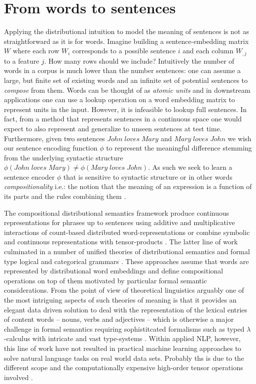\section{From words to sentences}
\label{sec:sentences}
Applying the distributional intuition to model the meaning of sentences is not as straightforward
as it is for words.
Imagine building a sentence-embedding matrix $W$ where each row $W_i$ corresponds to
a possible sentence $i$ and each column $W_{,j}$ to a feature $j$.
How many rows should we include? Intuitively the number of words in a corpus is much
lower than the number sentences: one can assume a large, but finite set
of existing words and an infinite set of
potential sentences to \emph{compose} from them.
Words can be thought of as \emph{atomic units} and
in downstream applications one can use a lookup operation on a word embedding matrix
to represent units in the input. However, it is infeasible to lookup full sentences.
In fact, from a method that represents sentences in a continuous space one would expect
to also represent and generalize to unseen sentences at test time.
Furthermore, given two sentences $\mathit{John \; loves \; Mary}$ and
$\mathit{Mary \; loves \; John}$ we wish our sentence encoding function
$\phi$ to represent the meaningful difference stemming from the underlying syntactic structure
$\phi(\mathit{John \; loves \; Mary}) \neq \phi(\mathit{Mary \; loves \; John})$.
As such we seek to learn a sentence encoder $\phi$ that is sensitive to
syntactic structure or in other words \emph{compositionality} i.e.:
the notion that the meaning of an expression is
a function of its parts and the rules combining them \citep{montague1970english}.

The compositional distributional semantics  framework  produce
continuous representations for phrases up to sentences using additive and multiplicative interactions
of count-based distributed word-representations \citep{mitchell2008vector} or combine symbolic and
continuous representations with tensor-products \citep{clark2007combining}.
The latter line of work culminated in a number of unified theories of
distributional semantics and formal type logical and categorical grammars
\citep{coecke2010mathematical,clarke2012context,baroni2014frege}.
These approaches assume that words are represented by distributional word embeddings
and define compositional operations on top of them motivated by particular formal
semantic considerations. From the point of view of theoretical linguistics arguably 
one of the most intriguing aspects of such theories of meaning is that 
it provides an elegant data driven solution to deal with the representation of the lexical entries of
content words -- nouns, verbs and adjectives -- which is otherwise a major challenge in formal semantics
requiring sophistitcated formalisms such as typed $\lambda$-calculus with intricate and vast
type-systems \citep{asher2011lexical}. Within applied NLP, however, this line of work have not resulted in
practical machine learning approaches to solve natural language tasks
on real world data sets. Probably ths is due to the different scope and
the computationally expensive high-order
tensor operations involved \citep{bowman2016modeling}.

